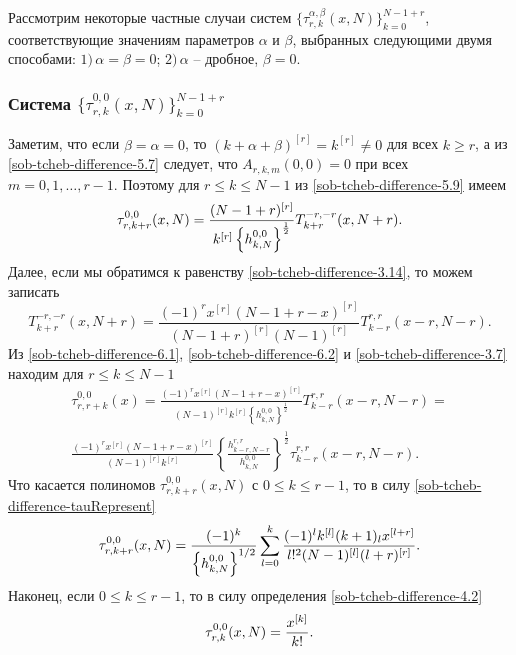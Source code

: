 Рассмотрим некоторые частные случаи систем  $\{\tau_{r,k}^{\alpha,\beta}(x,N)\}_{k=0}^{N-1+r}$, соответствующие значениям  параметров $\alpha$ и $\beta$, выбранных   следующими двумя способами: $1)\, \alpha=\beta=0$;
$2)\, \alpha$ -- дробное, $\beta=0$.

\subsubsection{Система $\{\tau_{r,k}^{0,0}(x,N)\}_{k=0}^{N-1+r} $}
 Заметим, что если $\beta=\alpha=0$, то  $(k+\alpha+\beta)^{[r]}=k^{[r]}\neq0$ для всех $k\ge r$, а из \eqref{sob-tcheb-difference-5.7} следует, что $A_{r,k,m}(0,0)=0$ при всех  $m=0,1,\dots, r-1$. Поэтому для $r\le k\le N-1$ из \eqref{sob-tcheb-difference-5.9}  имеем
\begin{equation}\label{sob-tcheb-difference-6.1}
\tau_{r,k+r}^{0,0}(x,N)=
{(N-1+r)^{[r]}\over k^{[r]}\left\{h_{k,N}^{0,0}\right\}^{\frac12}}
T_{k+r}^{-r,-r}(x,N+r).
\end{equation}
Далее, если мы обратимся к равенству \eqref{sob-tcheb-difference-3.14}, то можем записать
\begin{equation}\label{sob-tcheb-difference-6.2}
T_{k+r}^{-r,-r}(x,N+r)= \frac{(-1)^rx^{[r]}(N-1+r-x)^{[r]}}{(N-1+r)^{[r]}(N-1)^{[r]}}T_{k-r}^{r,r}(x-r,N-r) .
\end{equation}
Из   \eqref{sob-tcheb-difference-6.1}, \eqref{sob-tcheb-difference-6.2} и \eqref{sob-tcheb-difference-3.7} находим для $r\le k\le N-1$
\begin{multline}\label{sob-tcheb-difference-6.3}
\tau_{r,r+k}^{0,0}(x) =\frac{(-1)^rx^{[r]}(N-1+r-x)^{[r]}}{(N-1)^{[r]}k^{[r]}
\left\{h_{k,N}^{0,0}\right\}^{\frac12}}T_{k-r}^{r,r}(x-r,N-r)=\\
\frac{(-1)^rx^{[r]}(N-1+r-x)^{[r]}}{(N-1)^{[r]}k^{[r]}} \left\{\frac{h_{k-r,N-r}^{r,r}}{h_{k,N}^{0,0}}\right\}^{\frac12}
\tau_{k-r}^{r,r}(x-r,N-r).
\end{multline}
Что касается полиномов $\tau_{r,k+r}^{0,0}(x,N)$  с $0\le k \le r-1$, то в силу \eqref{sob-tcheb-difference-tauRepresent}
\begin{equation}\label{sob-tcheb-difference-6.4}
\tau_{r,k+r}^{0,0}(x,N)={(-1)^k\over
\left\{h_{k,N}^{0,0}\right\}^{1/2}}\sum_{l=0}^k {(-1)^lk^{[l]}(k+1)_lx^{[l+r]}\over
 l!^2(N-1)^{[l]}(l+r)^{[r]}   }.
\end{equation}
Наконец, если $0\le k\le r-1$, то в силу определения \eqref{sob-tcheb-difference-4.2}
\begin{equation}\label{sob-tcheb-difference-6.5}
\tau_{r,k}^{0,0}(x,N)={x^{[k]}\over k!}.
\end{equation}


